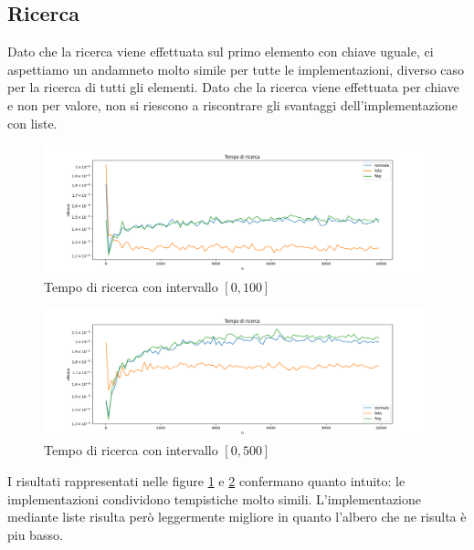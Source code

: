 \documentclass{article}
\begin{document}
\subsection{Ricerca}
Dato che la ricerca viene effettuata sul primo elemento con chiave uguale, ci aspettiamo un andamneto molto simile per tutte le implementazioni, diverso caso per la ricerca di tutti gli elementi. Dato che la ricerca viene effettuata per chiave e non per valore, non si riescono a riscontrare gli svantaggi dell'implementazione con liste. 
\begin{figure}[H]
\centering
  \centering
  \includegraphics[width=\linewidth]{img/search_graph_100_log.png}
  \caption{Tempo di ricerca con intervallo  \( [0, 100] \) }
  \label{search100}
\end{figure}
\begin{figure}[H]
\centering
  \centering
  \includegraphics[width=\linewidth]{img/search_graph_500_log.png}
  \caption{Tempo di ricerca con intervallo \( [0, 500] \) }
  \label{search500}
\end{figure}
I risultati rappresentati nelle figure \ref{search100} e \ref{search500} confermano quanto intuito: le implementazioni condividono tempistiche molto simili. 
L'implementazione mediante liste risulta però leggermente migliore in quanto l'albero che ne risulta è piu basso.
\end{document}
